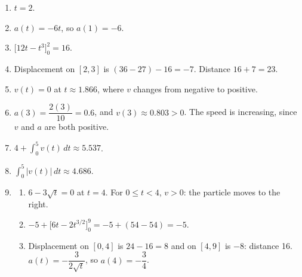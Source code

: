 \documentclass[11pt]{article}
\begin{document}
\newpage
\begin{solbox}
\begin{enumerate}[leftmargin=*,itemsep=4pt]
  \item $t=2$.
  \item $a(t)=-6t$, so $a(1)=-6$.
  \item $\Big[12t-t^3\Big]_0^2=16$.
  \item Displacement on $[2,3]$ is $(36-27)-16=-7$. Distance $16+7=23$.
  \item $v(t)=0$ at $t\approx1.866$, where $v$ changes from negative to positive.
  \item $a(3)=\dfrac{2(3)}{10}=0.6$, and $v(3)\approx0.803>0$. The speed is increasing, since $v$ and $a$ are both positive.
  \item $4+\displaystyle\int_{0}^{5}v(t)\,dt\approx5.537$.
  \item $\displaystyle\int_{0}^{5}|v(t)|\,dt\approx4.686$.
  \item \begin{enumerate}[label=(\alph*),leftmargin=*,itemsep=3pt]
    \item $6-3\sqrt t=0$ at $t=4$. For $0\le t<4$, $v>0$: the particle moves to the right.
    \item $-5+\Big[6t-2t^{3/2}\Big]_0^9=-5+(54-54)=-5$.
    \item Displacement on $[0,4]$ is $24-16=8$ and on $[4,9]$ is $-8$: distance 16. $a(t)=-\dfrac{3}{2\sqrt t}$, so $a(4)=-\dfrac34$.
  \end{enumerate}
\end{enumerate}
\end{solbox}
\end{document}
